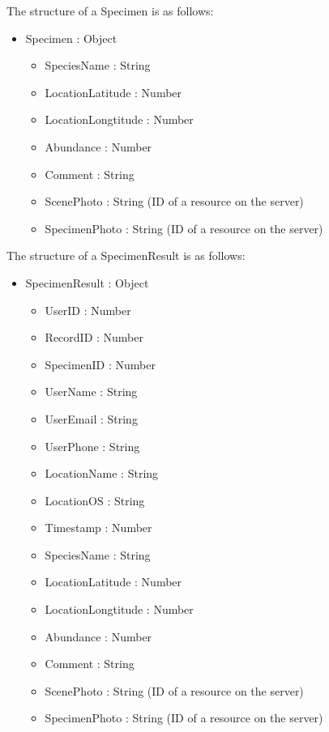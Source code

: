 \begin{itemize}
\begin{itemize}
\begin{itemize}
\begin{itemize}
        The structure of a Specimen is as follows:
        \begin{itemize}
            \item Specimen : Object
            \begin{itemize}
                \item SpeciesName : String
                \item LocationLatitude : Number
                \item LocationLongtitude : Number
                \item Abundance : Number
                \item Comment : String
                \item ScenePhoto : String (ID of a resource on the server)
                \item SpecimenPhoto : String (ID of a resource on the server)
            \end{itemize}
        \end{itemize}
        
        The structure of a SpecimenResult is as follows:
        \begin{itemize}
        	\item SpecimenResult : Object
        	\begin{itemize}
	        	\item UserID : Number
	        	\item RecordID : Number
	        	\item SpecimenID : Number
        		\item UserName : String
        		\item UserEmail : String
        		\item UserPhone : String
        		\item LocationName : String
        		\item LocationOS : String
        		\item Timestamp : Number
        		\item SpeciesName : String
        		\item LocationLatitude : Number
        		\item LocationLongtitude : Number
        		\item Abundance : Number
        		\item Comment : String
        		\item ScenePhoto : String (ID of a resource on the server)
        		\item SpecimenPhoto : String (ID of a resource on the server)
        	\end{itemize}
        \end{itemize}


\end{itemize}
\end{itemize}
\end{itemize}
\end{itemize}
